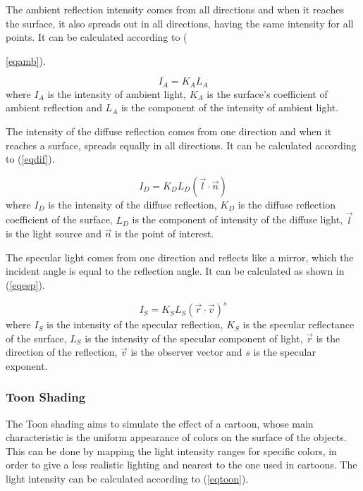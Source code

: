 \documentclass[10pt, conference, compsocconf]{IEEEtran}
\begin{document}
The ambient reflection intensity comes from all directions and when it reaches the surface, it also spreads out in all directions, having the same intensity for all points. It can be calculated according to ({\ref{eqamb}).

	\begin{equation}
		I_ {A} = K_ {A}L_ {A} 
	\label{eqamb}
	\end{equation}
	where  $I_A$ is the intensity of ambient light, $K_ {A}$ is the surface's coefficient of ambient reflection and $L_ {A}$ is the component of the intensity of ambient light.

The intensity of the diffuse reflection comes from one direction and when it reaches a surface, spreads equally in all directions. It can be calculated according to (\ref{eqdif}).

	\begin{equation}
		I_ {D} = K_ {D}L_ {D}( \vec{ l} \cdot \vec{ n}) 
	\label{eqdif}
	\end{equation}
	 where $I_D$ is the intensity of the diffuse reflection, $K_ {D}$ is the diffuse reflection coefficient of the surface, $L_ {D}$ is the component of intensity of the diffuse light, $\vec{ l}$ is the light source and $\vec{ n}$ is the point of interest.

The specular light comes from one direction and reflects like a mirror, which the incident angle is equal to the reflection angle. It can be calculated as shown in (\ref{eqesp}).

	\begin{equation}
		I_ {S} =K_ {S}L_ {S} (\vec{ r} \cdot \vec{ v})^s
	\label{eqesp}
	\end{equation}
	where $ I_S$ is the intensity of the specular reflection, $ K_ {S} $ is the specular reflectance of the surface, $ L_ {S} $ is the intensity of the specular component of light, $\vec{ r}$ is the direction of the reflection, $\vec{ v}$  is the observer vector and $ s $ is the specular exponent.

\subsubsection{Toon Shading}
\label{toon}

 The Toon shading aims to simulate the effect of a cartoon, whose main characteristic is the uniform appearance of colors on the surface of the objects.
This can be done by mapping the light intensity ranges for specific colors, in order to give a less realistic lighting and nearest to the one used in cartoons.
The light intensity can be calculated according to (\ref{eqtoon}).

}
\end{document}
